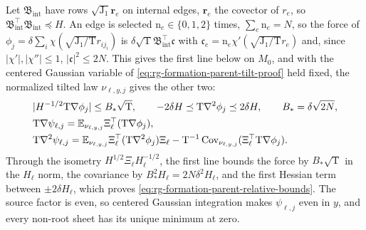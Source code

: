 Let \(\mathfrak B_{\mathrm{int}}\) have rows \(\sqrt{\mathrm J_1}\mathbf r_e\)
on internal edges, \(\mathbf r_e\) the covector of \(r_e\), so
\(\mathfrak B_{\mathrm{int}}^\top\mathfrak B_{\mathrm{int}}\preceq H\). An edge is
selected \(\mathrm n_e\in\{0,1,2\}\) times, \(\sum_e\mathrm n_e=N\), so the
force of \(\phi_j=\delta\sum_i\chi(\sqrt{\mathrm J_1/\mathrm T} r_{ij_i})\) is
\(\delta\sqrt{\mathrm T}\mathfrak B_{\mathrm{int}}^\top\mathfrak c\) with
\(\mathfrak c_e=\mathrm n_e\chi'(\sqrt{\mathrm J_1/\mathrm T} r_e)\) and, since
\(|\chi'|,|\chi''|\le1\), \(|\mathfrak c|^2\le2N\). This gives the first line
below on \(M_0\), and with the centered Gaussian variable of
\cref{eq:rg-formation-parent-tilt-proof} held fixed, the normalized tilted law
\(\nu_{\ell,y,j}\) gives the other two:
\begin{align}
 &|H^{-1/2}\mathrm T\nabla\phi_j|\le B_*\sqrt{\mathrm T},
 \qquad
 -2\delta H\preceq \mathrm T\nabla^2\phi_j\preceq2\delta H,
 \qquad B_*=\delta\sqrt{2N},
 \label{eq:rg-formation-original-relative-bounds}\\
 &\mathrm T\nabla\psi_{\ell,j}
 =\mathbb E_{\nu_{\ell,y,j}}\Xi_\ell^\top(\mathrm T\nabla\phi_j),
 \label{eq:rg-formation-marginal-force-proof}\\
 &\mathrm T\nabla^2\psi_{\ell,j}
 =\mathbb E_{\nu_{\ell,y,j}}\Xi_\ell^\top(\mathrm T\nabla^2\phi_j)\Xi_\ell
       -\mathrm T^{-1}\operatorname{Cov}_{\nu_{\ell,y,j}}
                    (\Xi_\ell^\top\mathrm T\nabla\phi_j).
 \label{eq:rg-formation-marginal-hessian-proof}
\end{align}
Through the isometry \(H^{1/2}\Xi_\ell H_\ell^{-1/2}\), the first line bounds
the force by \(B_*\sqrt{\mathrm T}\) in the \(H_\ell\) norm, the covariance by
\(B_*^2H_\ell=2N\delta^2H_\ell\), and the first Hessian term between
\(\pm2\delta H_\ell\), which proves
\cref{eq:rg-formation-parent-relative-bounds}. The source factor is even, so
centered Gaussian integration makes \(\psi_{\ell,j}\) even in \(y\), and every
non-root sheet has its unique minimum at zero.

